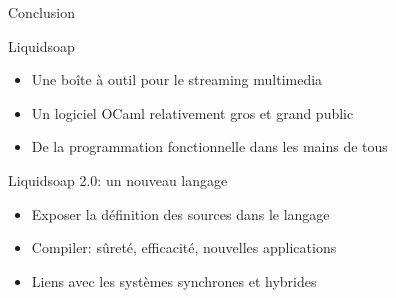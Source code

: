 \documentclass{beamer}
\begin{document}
\begin{frame}{Conclusion}

\begin{block}{Liquidsoap}
\begin{itemize}
  \item Une boîte à outil pour le streaming multimedia
  \item Un logiciel OCaml relativement gros et grand public
  \item De la programmation fonctionnelle dans les mains de tous
\end{itemize}
\end{block}

\vfill

\begin{block}{Liquidsoap 2.0: un nouveau langage}
\begin{itemize}
\item Exposer la définition des sources dans le langage
\item Compiler: sûreté, efficacité, nouvelles applications
\item Liens avec les systèmes synchrones et hybrides
\end{itemize}
\end{block}

\end{frame}
\end{document}
